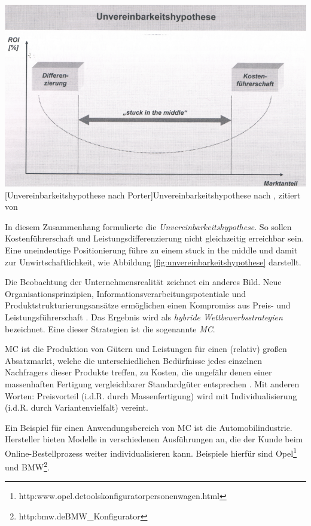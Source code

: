\documentclass[11pt, a4paper, titlepage, listof=totoc, bibliography=totoc, index=totoc, twoside, openright, headings=normal]{scrreprt}
\begin{document}
\vspace{1em}
\begin{minipage}{\linewidth}
	\centering
	\includegraphics[width=0.7\linewidth]{Abbildungen/unvereinbarkeitshypothese.png}
	[Unvereinbarkeitshypothese nach Porter]{Unvereinbarkeitshypothese nach \cite{porter80}, zitiert von \cite{schuh05}}
	\label{fig:unvereinbarkeitshypothese}
\end{minipage}
\vspace{0.3em}

In diesem Zusammenhang formulierte \citeauthor{porter80} die \emph{Unvereinbarkeitshypothese}. So sollen Kostenführerschaft und Leistungsdifferenzierung nicht gleichzeitig erreichbar sein. Eine uneindeutige Positionierung führe zu einem \glqq stuck in the middle\grqq{} und damit zur Unwirtschaftlichkeit, wie Abbildung \ref{fig:unvereinbarkeitshypothese} darstellt.

Die Beobachtung der Unternehmensrealität zeichnet ein anderes Bild. Neue Organisationsprinzipien, Informationsverarbeitungspotentiale und Produktstrukturierungsansätze ermöglichen einen Kompromiss aus Preis- und Leistungsführerschaft \citep{schuh05}. Das Ergebnis wird als \emph{hybride Wettbewerbsstrategien} bezeichnet. Eine dieser Strategien ist die sogenannte \emph{\ac{MC}}.

\ac{MC} ist die \glqq Produktion von Gütern und Leistungen für einen (relativ) großen Absatzmarkt, welche die unterschiedlichen Bedürfnisse jedes einzelnen Nachfragers dieser Produkte treffen, zu Kosten, die ungefähr denen einer massenhaften Fertigung vergleichbarer Standardgüter entsprechen\grqq{} \citep{piller98}. Mit anderen Worten: Preisvorteil (\ac{i.d.R.} durch Massenfertigung) wird mit Individualisierung (\ac{i.d.R.} durch Variantenvielfalt) vereint.

Ein Beispiel für einen Anwendungsbereich von \ac{MC} ist die Automobilindustrie. Hersteller bieten  Modelle in verschiedenen Ausführungen an, die der Kunde beim Online-Bestellprozess weiter individualisieren kann. Beispiele hierfür sind Opel\footnote{http:\/\/www.opel.de\/tools\/konfigurator\/personenwagen.html} und BMW\footnote{http:\/\/bmw.de\/BMW\_Konfigurator}.
\end{document}
